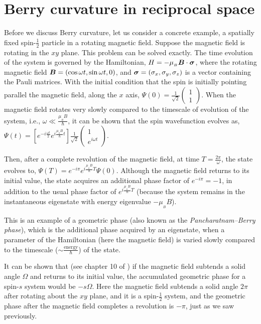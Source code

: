 \documentclass{report}
\renewcommand\vec[1]{\ensuremath\boldsymbol{#1}} %
\begin{document}
\chapter{Berry curvature in reciprocal space}
Before we discuss Berry curvature, let us consider a concrete example, a spatially fixed spin-$\frac{1}{2}$ particle in a rotating magnetic field. Suppose the magnetic field is rotating in the $xy$ plane. This problem can be solved exactly. The time evolution of the system is governed by the Hamiltonian, $H = -\mu_{_B} \vec{B}\cdot\vec{\sigma}$, where the rotating magnetic field $\vec{B} = (\cos{\omega t}, \sin{\omega t},0)$, and $\vec{\sigma} = (\sigma_x, \sigma_y, \sigma_z)$ is a vector containing the Pauli matrices. With the initial condition that the spin is initially pointing parallel the magnetic field, along the $x$ axis, $\Psi(0) = \frac{1}{\sqrt{2}}\begin{pmatrix}
	1 \\
	1 
\end{pmatrix}$. When the magnetic field rotates very slowly compared to the timescale of evolution of the system, i.e., $\omega \ll \frac{\mu_{_B} B}{\hbar}$, it can be shown that the spin wavefunction evolves as, $\Psi(t) = \left[e^{-i\frac{\omega t}{2}} e^{i \frac{\mu_{_B} B}{\hbar}t}\right] \frac{1}{\sqrt{2}}\begin{pmatrix}
1 \\
e^{i\omega t} 
\end{pmatrix}$.

Then, after a complete revolution of the magnetic field, at time $T = \frac{2\pi}{\omega}$, the state evolves to,
$\Psi(T) = e^{-i \pi} e^{i \frac{\mu_{_B} B}{\hbar} T} \Psi(0)$.
Although the magnetic field returns to its initial value, the state acquires an additional phase factor of $e^{-i \pi} = -1$, in addition to the usual phase factor of $e^{i \frac{\mu_{_B} B}{\hbar} T}$ (because the system remains in the instantaneous eigenstate with energy eigenvalue $- \mu_{_B} B$).

This is an example of a geometric phase (also known as the \textit{Pancharatnam–Berry phase}), which is the additional phase acquired by an eigenstate, when a parameter of the Hamiltonian (here the magnetic field) is varied slowly compared to the timescale ($\sim \frac{\text{energy}}{\hbar}$) of the state.

It can be shown that (see chapter 10 of \cite{book:Griffiths2004IntroductiontoQM}) if the magnetic field subtends a solid angle $\Omega$ and returns to its initial value, the accumulated geometric phase for a spin-$s$ system would be $-s{\Omega}$. Here the magnetic field subtends a solid angle $2 \pi$ after rotating about the $xy$ plane, and it is a spin-$\frac{1}{2}$ system, and the geometric phase after the magnetic field completes a revolution is $-\pi$, just as we saw previously.
\end{document}
